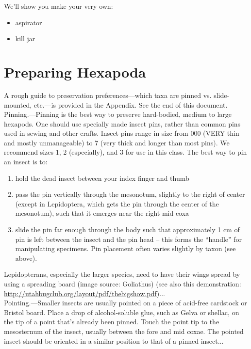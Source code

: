 \documentclass[letterpaper, 11pt]{article}
\begin{document}
We’ll show you make your very own:%
 
\begin{itemize}
\item aspirator
\item kill jar
\end{itemize}


\section{Preparing Hexapoda}
A rough guide to preservation preferences---which taxa are pinned vs. slide-mounted, etc.---is provided in the Appendix. See the end of this document.\\

Pinning.---Pinning is the best way to preserve hard-bodied, medium to large hexapods. One should use specially made insect pins, rather than common pins used in sewing and other crafts. Insect pins range in size from 000 (VERY thin and mostly unmanageable) to 7 (very thick and longer than most pins). We recommend sizes 1, 2 (especially), and 3 for use in this class. The best way to pin an insect is to:
 
\begin{enumerate}
\item hold the dead insect between your index finger and thumb
\item pass the pin vertically through the mesonotum, slightly to the right of center (except in Lepidoptera, which gets the pin through the center of the mesonotum), such that it emerges near the right mid coxa
\item slide the pin far enough through the body such that approximately 1 cm of pin is left between the insect and the pin head – this forms the “handle” for manipulating specimens. Pin placement often varies slightly by taxon (see above).
\end{enumerate}

Lepidopterans, especially the larger species, need to have their wings spread by using a spreading board (image source: Goliathus) (see also this demonstration: \url{http://utahbugclub.org/layout/pdf/thebigshow.pdf})...\\

Pointing.---Smaller insects are usually pointed on a piece of acid-free cardstock or Bristol board. Place a drop of alcohol-soluble glue, such as Gelva or shellac, on the tip of a point that’s already been pinned. Touch the point tip to the mesosternum of the insect, usually between the fore and mid coxae. The pointed insect should be oriented in a similar position to that of a pinned insect...\\
\end{document}
